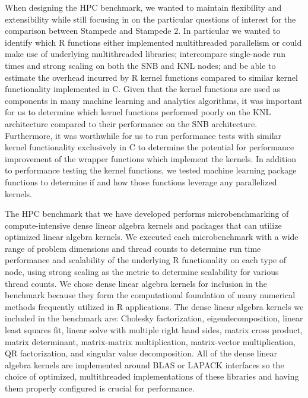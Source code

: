 When designing the HPC benchmark, we wanted to maintain flexibility and extensibility while
still focusing in on the particular questions of interest for the comparison between
Stampede and Stampede 2. In particular we wanted to identify which R functions either
implemented multithreaded parallelism or could make use of underlying multithreaded
libraries; intercompare single-node run times and strong scaling on both the SNB
and KNL nodes; and be able to estimate the overhead incurred by R kernel
functions compared to similar kernel functionality implemented in C. Given that the kernel
functions are used as components in many machine learning and analytics algorithms, it was
important for us to determine which kernel functions performed poorly on the KNL
architecture compared to their performance on the SNB architecture. Furthermore, it was
worthwhile for us to run performance tests with similar kernel functionality exclusively
in C to determine the potential for performance improvement of the wrapper functions which
implement the kernels. In addition to performance testing the kernel functions, we tested
machine learning package functions to determine if and how those functions leverage any
parallelized kernels.

The HPC benchmark that we have developed performs microbenchmarking of compute-intensive
dense linear algebra kernels and packages that can utilize optimized linear algebra
kernels. We executed each microbenchmark with a wide range of problem dimensions and
thread counts to determine run time performance and scalability of the underlying R
functionality on each type of node, using strong scaling as the metric to determine
scalability for various thread counts. We chose dense linear algebra kernels for inclusion
in the benchmark because they form the computational foundation of many numerical methods
frequently utilized in R applications. The dense linear algebra kernels we included in the
benchmark are: Cholesky factorization, eigendecomposition, linear least squares fit,
linear solve with multiple right hand sides, matrix cross product, matrix determinant,
matrix-matrix multiplication, matrix-vector multiplication, QR factorization, and singular
value decomposition. All of the dense linear algebra kernels are implemented around BLAS
or LAPACK interfaces so the choice of optimized, multithreaded implementations of these
libraries and having them properly configured is crucial for performance.


